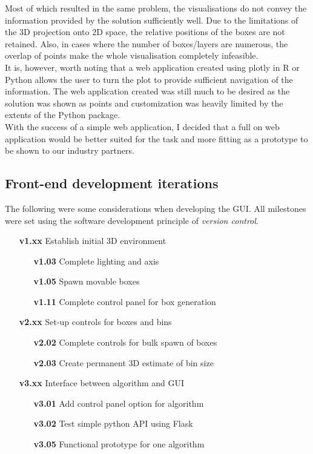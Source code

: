 \documentclass[a4paper, 11pt]{article}
\begin{document}
Most of which resulted in the same problem, the visualisations do not convey the information provided by the solution sufficiently well. Due to the limitations of the 3D projection onto 2D space, the relative positions of the boxes are not retained. Also, in cases where the number of boxes/layers are numerous, the overlap of points make the whole visualisation completely infeasible.\\
It is, however, worth noting that a web application created using plotly in R or Python allows the user to turn the plot to provide sufficient navigation of the information. The web application created was still much to be desired as the solution was shown as points and customization was heavily limited by the extents of the Python package.\\

With the success of a simple web application, I decided that a full on web application would be better suited for the task and more fitting as a prototype to be shown to our industry partners.

\subsection*{Front-end development iterations}

The following were some considerations when developing the GUI. All milestones were set using the software development principle of \textit{version control}.

\begin{enumerate}
\item[\textbf{v1.xx}] Establish initial 3D environment
\begin{enumerate}
\item[\textbf{v1.03}] Complete lighting and axis
\item[\textbf{v1.05}] Spawn movable boxes
\item[\textbf{v1.11}] Complete control panel for box generation  
\end{enumerate}
\item[\textbf{v2.xx}] Set-up controls for boxes and bins
\begin{enumerate}
\item[\textbf{v2.02}] Complete controls for bulk spawn of boxes
\item[\textbf{v2.03}] Create permanent 3D estimate of bin size
\end{enumerate}
\item[\textbf{v3.xx}] Interface between algorithm and GUI
\begin{enumerate}
\item[\textbf{v3.01}] Add control panel option for algorithm
\item[\textbf{v3.02}] Test simple python API using Flask
\item[\textbf{v3.05}] Functional prototype for one algorithm
\end{enumerate}
\end{enumerate}
\end{document}
